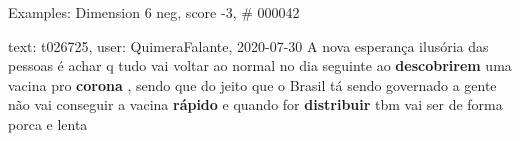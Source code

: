 \begin{frame}{Examples: Dimension 6 neg, score -3, \# 000042}
\footnotesize
\begin{alertblock}{text: t026725, user: QuimeraFalante, 2020-07-30}
A nova esperança ilusória das pessoas é achar q tudo vai voltar ao normal no 
dia seguinte ao \textbf{descobrirem} uma vacina pro \textbf{corona} , sendo que 
do jeito que o Brasil tá sendo governado a gente não vai conseguir a vacina 
\textbf{rápido} e quando for \textbf{distribuir} tbm vai ser de forma porca e 
lenta 
\end{alertblock}
\end{frame}
